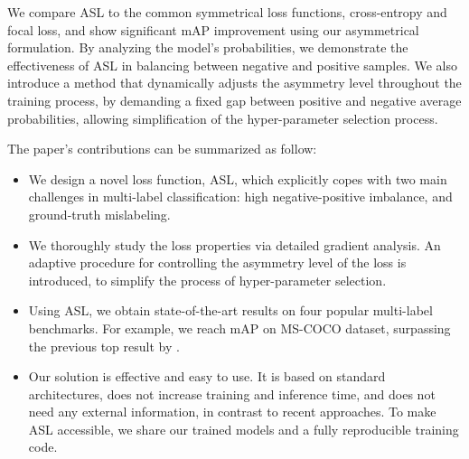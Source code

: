 We compare ASL to the common symmetrical loss functions, cross-entropy and focal loss, and show significant mAP improvement using our asymmetrical formulation. By analyzing the model's probabilities, we demonstrate the effectiveness of ASL in balancing between negative and positive samples. We also introduce a method that dynamically adjusts the asymmetry level throughout the training process, by demanding a fixed gap between positive and negative average probabilities, allowing simplification of the hyper-parameter selection process. 


The paper’s contributions can be summarized as follow:
\begin{itemize}[leftmargin=0.4cm]
  \setlength{\itemsep}{0.2pt}
  \setlength{\parskip}{0.2pt}
  \setlength{\parsep}{0.2pt}
\item We design a novel loss function, ASL, which explicitly copes with two main challenges in multi-label classification: high negative-positive imbalance, and ground-truth mislabeling.
  \item We thoroughly study the loss properties via detailed gradient analysis. An adaptive procedure for controlling the asymmetry level of the loss 
    is introduced, to simplify the process of hyper-parameter selection. 
  \item Using ASL, we obtain state-of-the-art results on four popular multi-label benchmarks. For example, we reach  mAP on MS-COCO dataset, surpassing the previous top result by .
  \item Our solution is effective and easy to use. It is based on standard architectures, does not increase training and inference time, and does not need any external information, in contrast to recent approaches. To make ASL accessible, we share our trained models and a fully reproducible training code.
\end{itemize}


%
